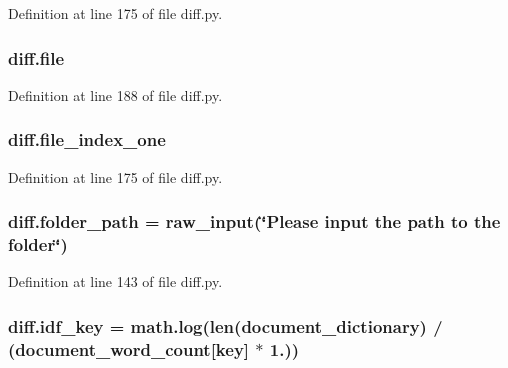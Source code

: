 Definition at line 175 of file diff.\+py.

\subsubsection[{\texorpdfstring{file}{file}}]{\setlength{\rightskip}{0pt plus 5cm}diff.\+file}\hypertarget{namespacediff_a3759e132757b6fdecd117a665d6158ab}{}\label{namespacediff_a3759e132757b6fdecd117a665d6158ab}


Definition at line 188 of file diff.\+py.

\subsubsection[{\texorpdfstring{file\+\_\+index\+\_\+one}{file_index_one}}]{\setlength{\rightskip}{0pt plus 5cm}diff.\+file\+\_\+index\+\_\+one}\hypertarget{namespacediff_ac8ee8a35e457d5004c0f85b0383faf26}{}\label{namespacediff_ac8ee8a35e457d5004c0f85b0383faf26}


Definition at line 175 of file diff.\+py.

\subsubsection[{\texorpdfstring{folder\+\_\+path}{folder_path}}]{\setlength{\rightskip}{0pt plus 5cm}diff.\+folder\+\_\+path = raw\+\_\+input(\char`\"{}Please input the path to the folder\char`\"{})}\hypertarget{namespacediff_adccd64c100d50ed0e87d46c33e8636eb}{}\label{namespacediff_adccd64c100d50ed0e87d46c33e8636eb}


Definition at line 143 of file diff.\+py.

\subsubsection[{\texorpdfstring{idf\+\_\+key}{idf_key}}]{\setlength{\rightskip}{0pt plus 5cm}diff.\+idf\+\_\+key = math.\+log(len({\bf document\+\_\+dictionary}) / ({\bf document\+\_\+word\+\_\+count}\mbox{[}key\mbox{]} $\ast$ 1.))}\hypertarget{namespacediff_a1798972d3d6361a79c16d8470bf3471d}{}\label{namespacediff_a1798972d3d6361a79c16d8470bf3471d}


